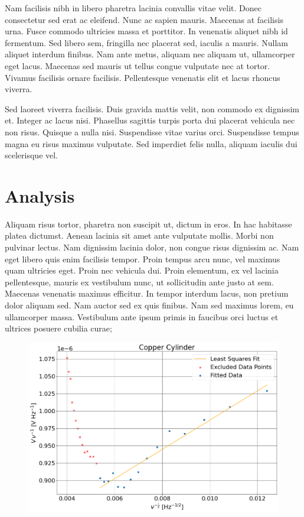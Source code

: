 \documentclass[a4paper,12pt]{article}
\begin{document}
\begin{multicols}{2}
		Nam facilisis nibh in libero pharetra lacinia convallis vitae velit. Donec consectetur sed erat ac eleifend. Nunc ac sapien mauris. Maecenas at facilisis urna. Fusce commodo ultricies massa et porttitor. In venenatis aliquet nibh id fermentum. Sed libero sem, fringilla nec placerat sed, iaculis a mauris. Nullam aliquet interdum finibus. Nam ante metus, aliquam nec aliquam ut, ullamcorper eget lacus. Maecenas sed mauris ut tellus congue vulputate nec at tortor. Vivamus facilisis ornare facilisis. Pellentesque venenatis elit et lacus rhoncus viverra.
		
		Sed laoreet viverra facilisis. Duis gravida mattis velit, non commodo ex dignissim et. Integer ac lacus nisi. Phasellus sagittis turpis porta dui placerat vehicula nec non risus. Quisque a nulla nisi. Suspendisse vitae varius orci. Suspendisse tempus magna eu risus maximus vulputate. Sed imperdiet felis nulla, aliquam iaculis dui scelerisque vel.
		
	\section{Analysis}
		Aliquam risus tortor, pharetra non suscipit ut, dictum in eros. In hac habitasse platea dictumst. Aenean lacinia sit amet ante vulputate mollis. Morbi non pulvinar lectus. Nam dignissim lacinia dolor, non congue risus dignissim ac. Nam eget libero quis enim facilisis tempor. Proin tempus arcu nunc, vel maximus quam ultricies eget. Proin nec vehicula dui. Proin elementum, ex vel lacinia pellentesque, mauris ex vestibulum nunc, ut sollicitudin ante justo at sem. Maecenas venenatis maximus efficitur. In tempor interdum lacus, non pretium dolor aliquam sed. Nam auctor sed ex quis finibus. Nam sed maximus lorem, eu ullamcorper massa. Vestibulum ante ipsum primis in faucibus orci luctus et ultrices posuere cubilia curae;
		
		\begin{figure}[h]
			\includegraphics[scale=0.5]{copperGraph.png}
		\end{figure}
	

\end{multicols}
\end{document}
